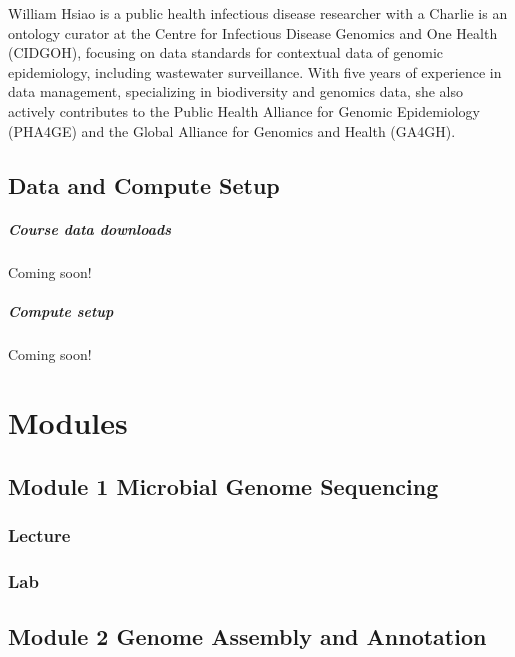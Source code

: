 \documentclass[
]{book}
\begin{document}
William Hsiao is a public health infectious disease researcher with a
Charlie is an ontology curator at the Centre for Infectious Disease
Genomics and One Health (CIDGOH), focusing on data standards for
contextual data of genomic epidemiology, including wastewater
surveillance. With five years of experience in data management,
specializing in biodiversity and genomics data, she also actively
contributes to the Public Health Alliance for Genomic Epidemiology
(PHA4GE) and the Global Alliance for Genomics and Health (GA4GH).

\chapter{Data and Compute Setup}\label{data-and-compute-setup}

\subsubsection{Course data downloads}\label{course-data-downloads}

Coming soon!

\subsubsection{Compute setup}\label{compute-setup}

Coming soon!

\part{Modules}\label{part-modules}

\chapter{Module 1 Microbial Genome Sequencing}\label{module-1-microbial-genome-sequencing}

\section{Lecture}\label{lecture}

\section{Lab}\label{lab}

\chapter{Module 2 Genome Assembly and Annotation}\label{module-2-genome-assembly-and-annotation}
\end{document}
